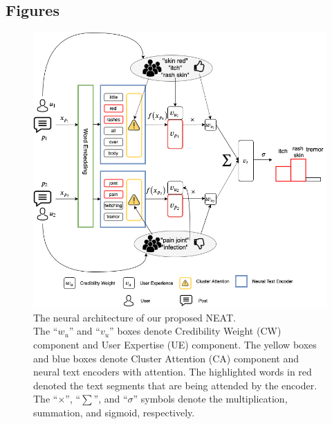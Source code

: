 \documentclass{bmcart}
\begin{document}
\begin{backmatter}


\pagebreak

\section*{Figures}
\begin{figure}[h!]
    \centering
    \captionsetup{justification=centering}
    \includegraphics[scale=0.5]{neat.png}
    \caption{The neural architecture of our proposed NEAT. \\ The ``$w_u$'' and ``$v_u$'' boxes denote Credibility Weight (CW) component and User Expertise (UE) component. The yellow boxes and blue boxes denote Cluster Attention (CA) component and neural text encoders with attention. The highlighted words in red denoted the text segments that are being attended by the encoder. The ``$\times$'', ``$\sum$'', and ``$\sigma$'' symbols denote the multiplication, summation, and sigmoid, respectively.}

\end{figure}
\end{backmatter}
\end{document}
